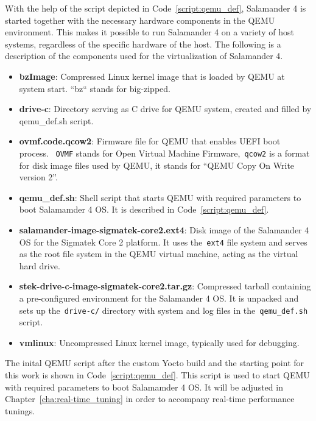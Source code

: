 \documentclass[MMR,Master,english]{twbook}
\begin{document}
\noindent With the help of the script depicted in Code~\ref{script:qemu_def}, Salamander 4 is started together with the necessary hardware components in the QEMU environment. This makes it possible to run Salamander 4 on a variety of host systems, regardless of the specific hardware of the host. The following is a description of the components used for the virtualization of Salamander 4.
\clearpage
\begin{itemize}
	\item \textbf{bzImage}: Compressed Linux kernel image that is loaded by QEMU at system start. ``bz`` stands for big-zipped.
	\item \textbf{drive-c}: Directory serving as C drive for QEMU system, created and filled by qemu\_def.sh script.
	\item \textbf{ovmf.code.qcow2}: Firmware file for QEMU that enables UEFI boot process. ~\texttt{OVMF} stands for Open Virtual Machine Firmware,~\texttt{qcow2} is a format for disk image files used by QEMU, it stands for ``QEMU Copy On Write version 2''.
	\item \textbf{qemu\_def.sh}: Shell script that starts QEMU with required parameters to boot Salamamder 4 OS. It is described in Code~\ref{script:qemu_def}.
	\item \textbf{salamander-image-sigmatek-core2.ext4}: Disk image of the Salamander 4 OS for the Sigmatek Core 2 platform. It uses the~\texttt{ext4} file system and serves as the root file system in the QEMU virtual machine, acting as the virtual hard drive.
	\item \textbf{stek-drive-c-image-sigmatek-core2.tar.gz}: Compressed tarball containing a pre-configured environment for the Salamander 4 OS. It is unpacked and sets up the~\texttt{drive-c/} directory with system and log files in the~\texttt{qemu\_def.sh} script.
	\item \textbf{vmlinux}: Uncompressed Linux kernel image, typically used for debugging.
\end{itemize}

\noindent The inital QEMU script after the custom Yocto build and the starting point for this work is shown in Code~\ref{script:qemu_def}. This script is used to start QEMU with required parameters to boot Salamamder 4 OS. It will be adjusted in Chapter~\ref{cha:real-time_tuning} in order to accompany real-time performance tunings.
\end{document}
